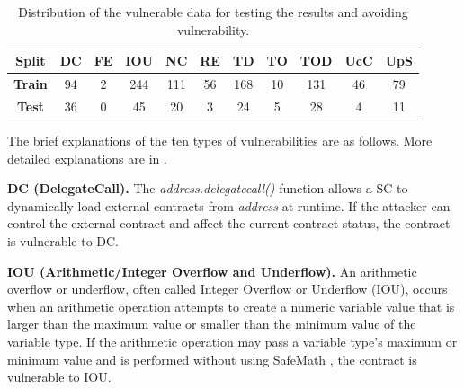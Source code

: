 \documentclass[12pt]{book}
\begin{document}
\begin{table}[htp]
\centering
\begin{threeparttable}
    \def\arraystretch{1.5}
    \setlength\tabcolsep{2pt} %
    \caption{Distribution of the vulnerable data for testing the results and avoiding vulnerability.}
    \label{tab:vulnerability-distribution}
    \begin{tabular}{*{11}{c}}%
        \toprule
        \textbf{Split} & \textbf{DC} & \textbf{FE} & \textbf{IOU} & \textbf{NC} & \textbf{RE} & \textbf{TD} & \textbf{TO} & \textbf{TOD} & \textbf{UcC} & \textbf{UpS}\\
        \midrule
        \textbf{Train} & 94 & 2 & 244 & 111 & 56 & 168 & 10 & 131 & 46 & 79 \\
        \textbf{Test} & 36 & 0 & 45 & 20 & 3 & 24 & 5 & 28 & 4 & 11 \\

       \bottomrule
    \end{tabular}
\end{threeparttable}
\end{table}

The brief explanations of the ten types of vulnerabilities are as follows. More detailed explanations are in \cite{Hu2023}.

\textbf{DC (DelegateCall).}
The \textit{address.delegatecall()} function allows a SC to dynamically load external contracts from \textit{address} at runtime. If the attacker can control the external contract and affect the current contract status, the contract is vulnerable to DC.

\textbf{IOU (Arithmetic/Integer Overflow and Underflow).}
An arithmetic overflow or underflow, often called Integer Overflow or Underflow (IOU), occurs when an arithmetic operation attempts to create a numeric variable value that is larger than the maximum value or smaller than the minimum value of the variable
type. If the arithmetic operation may pass a variable type’s maximum or minimum value and  is performed without using SafeMath \cite{safemath}, the contract is vulnerable to IOU.
\end{document}
